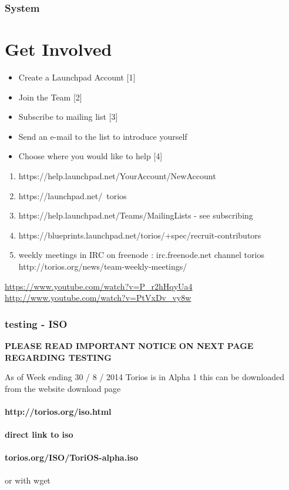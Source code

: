 \documentclass[12pt,a4paper]{book}
\begin{document}
\subsection{System}

\newpage

\subsection{}

\chapter{Get Involved}

\begin{itemize}
\item{Create a Launchpad Account [1]}
\item{Join the Team [2]}
\item{Subscribe to mailing list [3]}
\item{Send an e-mail to the list to introduce yourself}
\item{Choose where you would like to help [4]}
\end{itemize}


\begin{enumerate}
\item {https://help.launchpad.net/YourAccount/NewAccount}
\item {https://launchpad.net/~torios}
\item {https://help.launchpad.net/Teams/MailingLists - see subscribing}
\item{https://blueprints.launchpad.net/torios/+spec/recruit-contributors}
\item{weekly meetings in IRC on freenode : irc.freenode.net  channel torios http://torios.org/news/team-weekly-meetings/ }

\end{enumerate}

\url{https://www.youtube.com/watch?v=P_r2hHqyUa4} \\
\url{http://www.youtube.com/watch?v=PtVxDv_vy8w} \\

\newpage
\subsection {testing - ISO}
\bf{PLEASE READ IMPORTANT NOTICE ON NEXT PAGE REGARDING TESTING}

As of Week ending 30 / 8 / 2014 Torios is in Alpha 1 this can be downloaded from the website download page  \\ \\
\textbf{http://torios.org/iso.html}\\ \\
\textbf{direct link to iso} \\ \\
\textbf{torios.org/ISO/ToriOS-alpha.iso} \\ \\
or with wget  \\ \\
\end{document}
